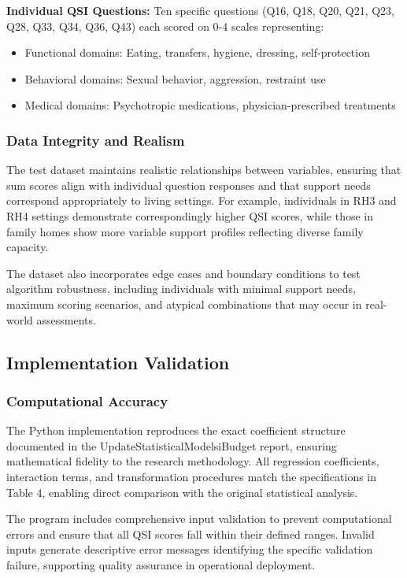 \textbf{Individual QSI Questions:}
Ten specific questions (Q16, Q18, Q20, Q21, Q23, Q28, Q33, Q34, Q36, Q43) each scored on 0-4 scales representing:
\begin{itemize}
    \item Functional domains: Eating, transfers, hygiene, dressing, self-protection
    \item Behavioral domains: Sexual behavior, aggression, restraint use
    \item Medical domains: Psychotropic medications, physician-prescribed treatments
\end{itemize}

\subsubsection{Data Integrity and Realism}

The test dataset maintains realistic relationships between variables, ensuring that sum scores align with individual question responses and that support needs correspond appropriately to living settings. For example, individuals in RH3 and RH4 settings demonstrate correspondingly higher QSI scores, while those in family homes show more variable support profiles reflecting diverse family capacity.

The dataset also incorporates edge cases and boundary conditions to test algorithm robustness, including individuals with minimal support needs, maximum scoring scenarios, and atypical combinations that may occur in real-world assessments.

\subsection{Implementation Validation}

\subsubsection{Computational Accuracy}

The Python implementation reproduces the exact coefficient structure documented in the UpdateStatisticalModelsiBudget report, ensuring mathematical fidelity to the research methodology. All regression coefficients, interaction terms, and transformation procedures match the specifications in Table 4, enabling direct comparison with the original statistical analysis.

The program includes comprehensive input validation to prevent computational errors and ensure that all QSI scores fall within their defined ranges. Invalid inputs generate descriptive error messages identifying the specific validation failure, supporting quality assurance in operational deployment.

